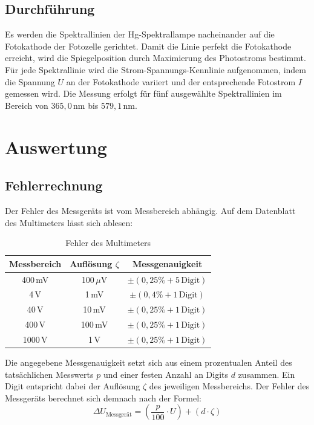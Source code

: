 \documentclass[12pt,a4paper,titlepage]{scrartcl}
\numberwithin{equation}{section}
\numberwithin{table}{section}
\numberwithin{figure}{section}
\begin{document}
\subsection{Durchführung}
Es werden die Spektrallinien der Hg-Spektrallampe nacheinander auf die Fotokathode der Fotozelle gerichtet. Damit die Linie perfekt die Fotokathode erreicht, wird die Spiegelposition durch Maximierung des Photostroms bestimmt. Für jede Spektrallinie wird die Strom-Spannungs-Kennlinie aufgenommen, indem die Spannung $U$ an der Fotokathode variiert und der entsprechende Fotostrom $I$ gemessen wird. Die Messung erfolgt für fünf ausgewählte Spektrallinien im Bereich von $365,0\,\text{nm}$ bis $579,1\,\text{nm}$.

\section{Auswertung}

\subsection{Fehlerrechnung}

Der Fehler des Messgeräts ist vom Messbereich abhängig. Auf dem Datenblatt des Multimeters lässt sich ablesen:

\begin{table}[H]
    \centering
    \caption{Fehler des Multimeters}
    \begin{tabular}{|c|c|c|}
    \hline
    \textbf{Messbereich} & \textbf{Auflösung $\zeta$} & \textbf{Messgenauigkeit} \\
    \hline
    400\,mV & 100\,$\mu$V & $\pm(0,25\% + 5\,\text{Digit})$ \\
    4\,V    & 1\,mV       & $\pm(0,4\% + 1\,\text{Digit})$ \\
    40\,V   & 10\,mV      & $\pm(0,25\% + 1\,\text{Digit})$ \\
    400\,V  & 100\,mV     & $\pm(0,25\% + 1\,\text{Digit})$ \\
    1000\,V & 1\,V        & $\pm(0,25\% + 1\,\text{Digit})$ \\
    \hline
    \end{tabular}
\end{table}

Die angegebene Messgenauigkeit setzt sich aus einem prozentualen Anteil des tatsächlichen Messwerts $p$ und einer festen Anzahl an Digits $d$ zusammen. Ein Digit entspricht dabei der Auflösung $\zeta$ des jeweiligen Messbereichs. Der Fehler des Messgeräts berechnet sich demnach nach der Formel:
\begin{equation}
    \Delta U_{\text{Messgerät}} = \left( \frac{p}{100} \cdot U \right) + (d \cdot \zeta)
    \label{eq:messgeraet_fehler}
\end{equation}
\end{document}
